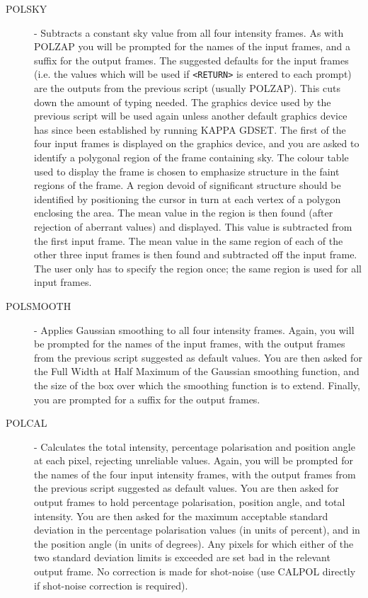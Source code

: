 \begin{description}
\item [POLSKY] - Subtracts a constant sky value from all four intensity
frames.  As with {\small POLZAP} you will be prompted for the names of
the input frames, and a suffix for the output frames. The suggested
defaults for the input frames (i.e. the values which will be used if
\verb+<RETURN>+ is entered to each prompt) are the outputs from the
previous script (usually {\small POLZAP}). This cuts down the amount of
typing needed. The graphics device used by the previous script will be
used again unless another default graphics device has since been
established by running {\small KAPPA GDSET}. The first of the four
input frames is displayed on the graphics device, and you are asked to
identify a polygonal region of the frame containing sky. The colour
table used to display the frame is chosen to emphasize structure in the
faint regions of the frame. A region devoid of significant structure
should be identified by positioning the cursor in turn at each vertex
of a polygon enclosing the area.  The mean value in the region is then
found (after rejection of aberrant values) and displayed. This value is
subtracted from the first input frame. The mean value in the same
region of each of the other three input frames is then found and
subtracted off the input frame. The user only has to specify the region
once; the same region is used for all input frames.

\item [POLSMOOTH] - Applies Gaussian smoothing to all four intensity
frames.  Again, you will be prompted for the names of the input frames,
with the output frames from the previous script suggested as default
values. You are then asked for the Full Width at Half Maximum of the
Gaussian smoothing function, and the size of the box over which the
smoothing function is to extend. Finally, you are prompted for a suffix
for the output frames.

\item [POLCAL] - Calculates the total intensity, percentage
polarisation and position angle at each pixel, rejecting unreliable
values. Again, you will be prompted for the names of the four input
intensity frames, with the output frames from the previous script
suggested as default values. You are then asked for output frames to
hold percentage polarisation, position angle, and total intensity. You
are then asked for the maximum acceptable standard deviation in the
percentage polarisation values (in units of percent), and in the
position angle (in units of degrees). Any pixels for which either of
the two standard deviation limits is exceeded are set bad in the
relevant output frame. No correction is made for shot-noise (use
{\small CALPOL} directly if shot-noise correction is required).


\end{description}
